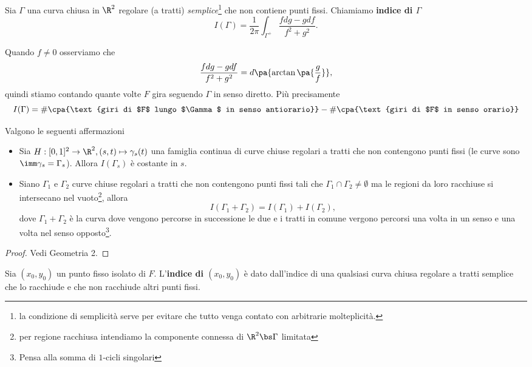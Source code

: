\begin{definition}
Sia $\Gamma$ una curva chiusa in $\R^2$ regolare (a tratti) \textit{semplice}\footnote{la condizione di semplicit\`a serve per evitare che tutto venga contato con arbitrarie molteplicit\`a.} che non contiene punti fissi. Chiamiamo \textbf{indice di $\Gamma$}
\[I(\Gamma)=\frac1{2\pi}\int_{\Gamma^+}\frac{fdg-gdf}{f^2+g^2}.\]
\end{definition}
\begin{remark}
Quando $f\neq 0$ osserviamo che
\[\frac{fdg-gdf}{f^2+g^2}=d\pa{\arctan\pa{\frac gf}},\]
quindi stiamo contando quante volte $F$ gira seguendo $\Gamma$ in senso diretto. Pi\`u precisamente
\[I(\Gamma)=\#\cpa{\text{giri di $F$ lungo $\Gamma$ in senso antiorario}}-\#\cpa{\text{giri di $F$ in senso orario}}\]
\end{remark}


\setlength{\leftmargini}{0.5cm}
\begin{proposition}\label{ProprietaIndice}
Valgono le seguenti affermazioni
\begin{itemize}
\item Sia $H:[0,1]^2\to \R^2, (s,t)\mapsto \gamma_s(t)$ una famiglia continua di curve chiuse regolari a tratti che non contengono punti fissi (le curve sono $\imm\gamma_s=\Gamma_s$). Allora $I(\Gamma_s)$ \`e costante in $s$.
\item Siano $\Gamma_1$ e $\Gamma_2$ curve chiuse regolari a tratti che non contengono punti fissi tali che $\Gamma_1\cap \Gamma_2\neq \emptyset$ ma le regioni da loro racchiuse si intersecano nel vuoto\footnote{per regione racchiusa intendiamo la componente connessa di $\R^2\bs \Gamma$ limitata}, allora
\[I(\Gamma_1+\Gamma_2)=I(\Gamma_1)+I(\Gamma_2),\]
dove $\Gamma_1+\Gamma_2$ \`e la curva dove vengono percorse in successione le due e i tratti in comune vergono percorsi una volta in un senso e una volta nel senso opposto\footnote{Pensa alla somma di $1$-cicli singolari}.
\end{itemize}
\end{proposition}
\begin{proof}
Vedi Geometria 2.
\end{proof}

\begin{definition}
Sia $(x_0,y_0)$ un punto fisso isolato di $F$. L'\textbf{indice di $(x_0,y_0)$} \`e dato dall'indice di una qualsiasi curva chiusa regolare a tratti semplice che lo racchiude e che non racchiude altri punti fissi.
\end{definition}

